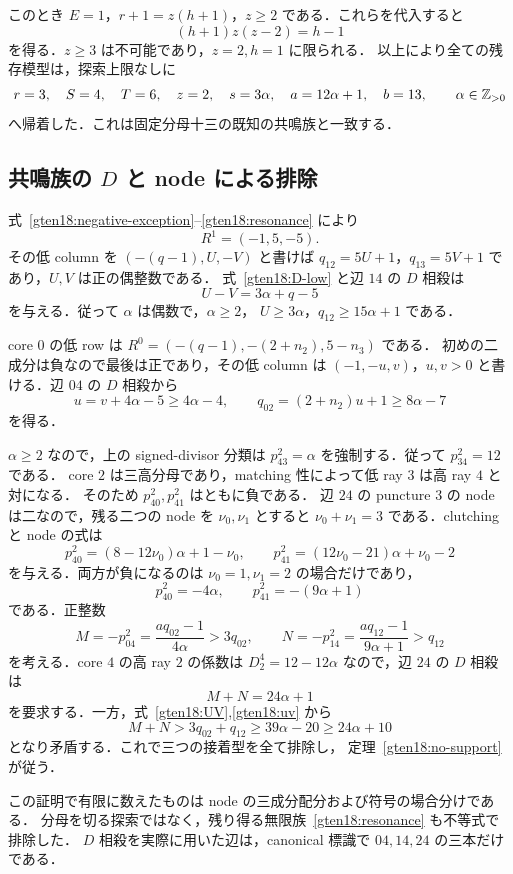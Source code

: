 このとき $E=1$，$r+1=z(h+1)$，$z\ge2$ である．これらを代入すると
\[
 (h+1)z(z-2)=h-1
\]
を得る．$z\ge3$ は不可能であり，$z=2,h=1$ に限られる．
以上により全ての残存模型は，探索上限なしに
\begin{equation}\label{gten18:resonance}
 r=3,\quad S=4,\quad T=6,\quad z=2,\quad s=3\alpha,\quad
 a=12\alpha+1,\quad b=13,\qquad \alpha\in\mathbb Z_{>0}
\end{equation}
へ帰着した．これは固定分母十三の既知の共鳴族と一致する．

\subsection{共鳴族の \texorpdfstring{$D$}{D} と node による排除}

式~\eqref{gten18:negative-exception}--\eqref{gten18:resonance} により
\[
 R^1=(-1,5,-5).
\]
その低 column を $(-(q-1),U,-V)$ と書けば
$q_{12}=5U+1$，$q_{13}=5V+1$ であり，$U,V$ は正の偶整数である．
式~\eqref{gten18:D-low} と辺 $14$ の $D$ 相殺は
\begin{equation}\label{gten18:UV}
 U-V=3\alpha+q-5
\end{equation}
を与える．従って $\alpha$ は偶数で，$\alpha\ge2$，
$U\ge3\alpha$，$q_{12}\ge15\alpha+1$ である．

core $0$ の低 row は
$R^0=(-(q-1),-(2+n_2),5-n_3)$ である．
初めの二成分は負なので最後は正であり，その低 column は
$(-1,-u,v)$，$u,v>0$ と書ける．辺 $04$ の $D$ 相殺から
\begin{equation}\label{gten18:uv}
 u=v+4\alpha-5\ge4\alpha-4,\qquad
 q_{02}=(2+n_2)u+1\ge8\alpha-7
\end{equation}
を得る．

$\alpha\ge2$ なので，上の signed-divisor 分類は
$p^2_{43}=\alpha$ を強制する．従って $p^2_{34}=12$ である．
core $2$ は三高分母であり，matching 性によって低 ray $3$ は高 ray $4$ と対になる．
そのため $p^2_{40},p^2_{41}$ はともに負である．
辺 $24$ の puncture $3$ の node は二なので，残る二つの node を $\nu_0,\nu_1$ とすると
$\nu_0+\nu_1=3$ である．clutching と node の式は
\[
 p^2_{40}=(8-12\nu_0)\alpha+1-\nu_0,\qquad
 p^2_{41}=(12\nu_0-21)\alpha+\nu_0-2
\]
を与える．両方が負になるのは $\nu_0=1,\nu_1=2$ の場合だけであり，
\[
 p^2_{40}=-4\alpha,\qquad p^2_{41}=-(9\alpha+1)
\]
である．正整数
\[
 M=-p^2_{04}=\frac{a q_{02}-1}{4\alpha}>3q_{02},\qquad
 N=-p^2_{14}=\frac{a q_{12}-1}{9\alpha+1}>q_{12}
\]
を考える．core $4$ の高 ray $2$ の係数は
$D^4_2=12-12\alpha$ なので，辺 $24$ の $D$ 相殺は
\[
 M+N=24\alpha+1
\]
を要求する．一方，式~\eqref{gten18:UV},\eqref{gten18:uv} から
\[
 M+N>3q_{02}+q_{12}
       \ge39\alpha-20
       \ge24\alpha+10
\]
となり矛盾する．これで三つの接着型を全て排除し，
定理~\ref{gten18:no-support} が従う．

この証明で有限に数えたものは node の三成分配分および符号の場合分けである．
分母を切る探索ではなく，残り得る無限族~\eqref{gten18:resonance} も不等式で排除した．
$D$ 相殺を実際に用いた辺は，canonical 標識で $04,14,24$ の三本だけである．
